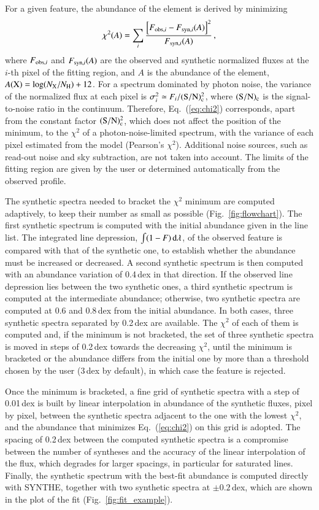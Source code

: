 \documentclass{aa}
\begin{document}
For a given feature, the abundance of the element is derived by
minimizing
\begin{equation}
\chi^2(A) = \sum_{i}
\frac{\left[F_{{\rm obs},i} - F_{{\rm syn},i}(A)\right]^2}
     {F_{{\rm syn},i}(A)}\,,
\label{eq:chi2}
\end{equation}
where $F_{{\rm obs},i}$ and $F_{{\rm syn},i}(A)$ are the observed and
synthetic normalized fluxes at the $i$-th pixel of the fitting region,
and $A$ is the abundance of the element, $A({\rm X})=\log(N_{\rm
X}/N_{\rm H})+12$. For a spectrum dominated by photon noise, the
variance of the normalized flux at each pixel is $\sigma_i^2\simeq
F_i/({\rm S/N})_{\rm c}^2$, where $({\rm S/N})_{\rm c}$ is the
signal-to-noise ratio in the continuum. Therefore, Eq.~(\ref{eq:chi2})
corresponds, apart from the constant factor $({\rm S/N})_{\rm c}^2$,
which does not affect the position of the minimum, to the $\chi^2$ of a
photon-noise-limited spectrum, with the variance of each pixel
estimated from the model (Pearson's $\chi^2$). Additional noise sources,
such as read-out noise and sky subtraction, are not taken into
account. The limits of the fitting region are given by the
user or determined automatically from the observed profile.

The synthetic spectra needed to bracket the $\chi^2$ minimum are
computed adaptively, to keep their number as small as possible
(Fig.~\ref{fig:flowchart}). The first synthetic spectrum is computed with
the initial abundance given in the line list. The integrated line
depression, $\int(1-F)\,{\rm d}\lambda$, of the observed feature is
compared with that of the synthetic one, to establish whether the
abundance must be increased or decreased. A second synthetic spectrum
is then computed with an abundance variation of 0.4\,dex in that
direction. If the observed line depression lies between the two
synthetic ones, a third synthetic spectrum is computed at the
intermediate abundance; otherwise, two synthetic spectra are computed
at 0.6 and 0.8\,dex from the initial abundance. In both cases, three
synthetic spectra separated by 0.2\,dex are available. The $\chi^2$ of
each of them is computed and, if the minimum is not bracketed, the set
of three synthetic spectra is moved in steps of 0.2\,dex towards the
decreasing $\chi^2$, until the minimum is bracketed or the abundance
differs from the initial one by more than a threshold chosen by the user
(3\,dex by default), in which case the feature is rejected.

Once the minimum is bracketed, a fine grid of synthetic spectra with a
step of 0.01\,dex is built by linear interpolation in abundance of the
synthetic fluxes, pixel by pixel, between the synthetic spectra
adjacent to the one with the lowest $\chi^2$, and the abundance that
minimizes Eq.~(\ref{eq:chi2}) on this grid is adopted. The spacing of
0.2\,dex between the computed synthetic spectra is a compromise between
the number of syntheses and the accuracy of the linear interpolation of
the flux, which degrades for larger spacings, in particular for
saturated lines. Finally, the synthetic spectrum with the best-fit
abundance is computed directly with SYNTHE, together with two synthetic
spectra at $\pm0.2$\,dex, which are shown in the plot of the fit
(Fig.~\ref{fig:fit_example}).
\end{document}
